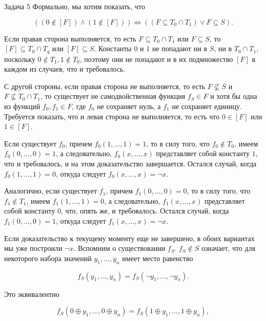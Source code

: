 \documentclass{article}
\begin{document}
	\begin{section}{Задача 5}
		Формально, мы хотим показать, что

		\begin{equation*}
			((0 \not\in [F]) \land (1 \not\in [F])) \iff ((F \subseteq T_0 \cap T_1) \lor F \subseteq S).
		\end{equation*}

		Если правая сторона выполняется, то есть $F \subseteq T_0 \cap T_1$ или $F \subseteq S$, то $[F] \subseteq T_0 \cap T_q$ или $[F] \subseteq S$. Константы $0$ и $1$ не попадают ни в $S$, ни в $T_0 \cap T_1$, поскольку $0 \not\in T_1, 1 \not\in T_0$, поэтому они не попадают и в их подмножество $[F]$ в каждом из случаев, что и требовалось.

		С другой стороны, если правая сторона не выполняется, то есть $F \not\subseteq S$ и $F \not\subseteq T_0 \cap T_1$, то существует не самодвойственная функция $f_S \in F$ и хотя бы одна из функций $f_0, f_1 \in F$, где $f_0$ не сохраняет нуль, а $f_1$ не сохраняет единицу. Требуется показать, что и левая сторона не выполняется, то есть что $0 \in [F]$ или $1 \in [F]$.

		Если существует $f_0$, причем $f_0(1, \dots, 1) = 1$, то в силу того, что $f_0 \not\in T_0$, имеем $f_0(0, \dots, 0) = 1$, а следовательно, $f_0(x, \dots, x)$ представляет собой константу $1$, что и требовалось, и на этом доказательство завершается. Остался случай, когда $f_0(1, \dots, 1) = 0$, откуда следует $f_0(x, \dots, x) = \neg x$.

		Аналогично, если существует $f_1$, причем $f_1(0, \dots, 0) = 0$, то в силу того, что $f_1 \not\in T_1$, имеем $f_1(1, \dots, 1) = 0$, а следовательно, $f_1(x, \dots, x)$ представляет собой константу $0$, что, опять же, и требовалось. Остался случай, когда $f_1(0, \dots, 0) = 1$, откуда следует $f_1(x, \dots, x) = \neg x$.

		Если доказательство к текущему моменту еще не завершено, в обоих вариантах мы уже построили $\neg x$. Вспомним о существовании $f_S$. $f_S \not\in S$ означает, что для некоторого набора значений $y_1, \dots, y_n$ имеет место равенство

		\begin{equation*}
			f_S(y_1, \dots, y_n) = f_S(\neg y_1, \dots, \neg y_n).
		\end{equation*}

		Это эквивалентно

		\begin{equation*}
			f_S(0 \oplus y_1, \dots, 0 \oplus y_n) = f_S(1 \oplus y_1, \dots, 1 \oplus y_n),
		\end{equation*}


\end{section}
\end{document}
